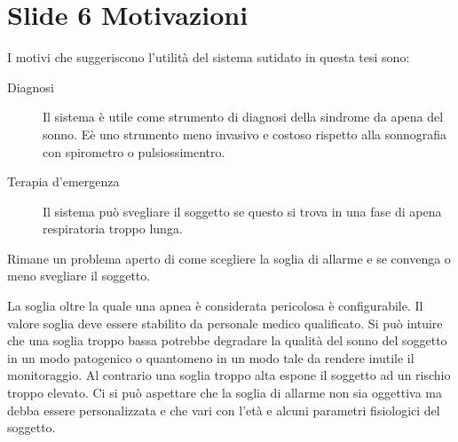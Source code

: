 \section{Slide 6 Motivazioni}

I motivi che suggeriscono l'utilit\`a del sistema sutidato in questa tesi sono:
\begin{description}
 \item[Diagnosi] 
    Il sistema \`e utile come strumento di diagnosi della sindrome da apena del sonno. E\`e uno strumento meno invasivo e costoso rispetto alla sonnografia con spirometro o pulsiossimentro.
 \item[Terapia d'emergenza]
  Il sistema pu\`o svegliare il soggetto se questo si trova in una fase di apena respiratoria troppo lunga. 
\end{description}

Rimane un problema aperto di come scegliere la soglia di allarme e se convenga o meno svegliare il soggetto.

 La soglia oltre la quale una apnea \`e considerata pericolosa \`e configurabile. 
 Il valore soglia deve essere stabilito da personale medico qualificato. 
 Si pu\`o intuire che una soglia troppo bassa potrebbe degradare la qualit\`a del sonno del soggetto in un modo patogenico o quantomeno in un modo tale da rendere inutile il monitoraggio. 
 Al contrario una soglia troppo alta espone il soggetto ad un rischio troppo elevato. 
 Ci si pu\`o aspettare che la soglia di allarme non sia oggettiva ma debba essere personalizzata e che vari con l'et\`a e alcuni parametri fisiologici del soggetto.


